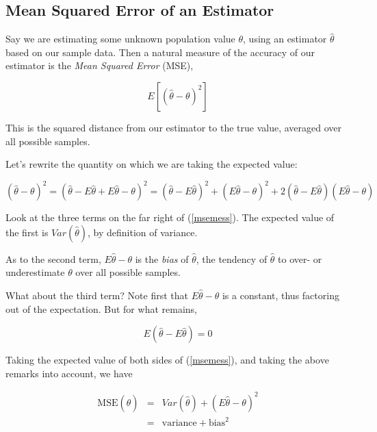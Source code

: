 \subsection{Mean Squared Error of an Estimator}
\label{mse}

Say we are estimating some unknown population value $\theta$, using an
estimator $\widehat{\theta}$ based on our sample data.  Then a natural
measure of the accuracy of our estimator is the {\it Mean Squared
Error} (MSE),

\begin{equation}
E[(\widehat{\theta} - \theta)^2]
\end{equation}

This is the squared distance from our estimator to the true value, 
averaged over all possible samples.

Let's rewrite the quantity on which we are taking the expected value:

\begin{equation}
\label{msemess}
\left (
\widehat{\theta} - \theta
\right )^2 =
\left (
\widehat{\theta} - 
E\widehat{\theta} +
E\widehat{\theta} -
\theta
\right )^2
=
(\widehat{\theta} - E\widehat{\theta})^2 +
(E\widehat{\theta} - \theta)^2 + 
2 (\widehat{\theta} - E\widehat{\theta}) (E\widehat{\theta} - \theta)
\end{equation}

Look at the three terms on the far right of (\ref{msemess}).  The
expected value of the first is $Var(\widehat{\theta})$, by definition of
variance.

As to the second term, $E\widehat{\theta} - \theta$ is the {\it bias} of
$\widehat{\theta}$, the tendency of $\widehat{\theta}$ to over- or
underestimate $\theta$ over all possible samples.

What about the third term?  Note first that $E\widehat{\theta} - \theta$
is a constant, thus factoring out of the expectation.  But for what
remains,

\begin{equation}
E(\widehat{\theta} - E\widehat{\theta}) = 0
\end{equation}

Taking the expected value of both sides of (\ref{msemess}), and taking the
above remarks into account, we have

\begin{eqnarray}
\label{famousmse}
\textrm{MSE}(\widehat{\theta}) &=& Var(\widehat{\theta}) + 
(E\widehat{\theta} - \theta)^2 \\
&=& \textrm{variance} + \textrm{bias}^2
\end{eqnarray}

